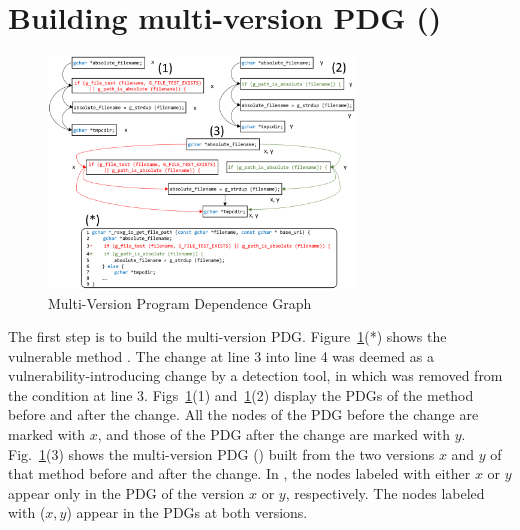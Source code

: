 \section{Building multi-version PDG ({\mvpdgxy})}
\label{delta:sec}

\begin{figure}[t]
	\centering
	\includegraphics[width=3.2in]{graphs/multi-version-pdg.png}
	\vspace{-8pt}
	\caption{Multi-Version Program Dependence Graph}
        \vspace{-12pt}
	\label{fig:multi-version-pdg}
\end{figure}

The first step is to build the multi-version PDG.
Figure~\ref{fig:multi-version-pdg}(*) shows the vulnerable method
. The change at line 3 into line 4 was
deemed as a vulnerability-introducing change by a detection tool, in
which   was
removed from the condition at line
3. Figs~\ref{fig:multi-version-pdg}(1)
and~\ref{fig:multi-version-pdg}(2) display the PDGs of the method
 before and after the change. All the
nodes of the PDG before the change are marked with $x$, and those of
the PDG after the change are marked with
$y$. Fig.~\ref{fig:multi-version-pdg}(3) shows the multi-version
PDG ({\mvpdgxy}) built from the two versions $x$ and
$y$ of that method before and after the change. In {\mvpdgxy}, the
nodes labeled with either $x$ or $y$ appear only in the PDG of the
version $x$ or $y$, respectively. The nodes labeled with ($x,y$)
appear in the PDGs at both versions.



